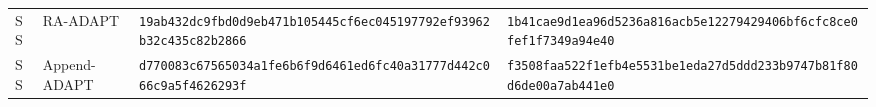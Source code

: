 \documentclass[10pt,letterpaper]{article}
\begin{document}
\begin{longtable}{@{}llp{2.55in}p{2.55in}@{}}
SS & RA-ADAPT & \texttt{19ab432d}\allowbreak{}\texttt{c9fbd0d9}\allowbreak{}\texttt{eb471b10}\allowbreak{}\texttt{5445cf6e}\allowbreak{}\texttt{c0451977}\allowbreak{}\texttt{92ef9396}\allowbreak{}\texttt{2b32c435}\allowbreak{}\texttt{c82b2866}\allowbreak{} & \texttt{1b41cae9}\allowbreak{}\texttt{d1ea96d5}\allowbreak{}\texttt{236a816a}\allowbreak{}\texttt{cb5e1227}\allowbreak{}\texttt{9429406b}\allowbreak{}\texttt{f6cfc8ce}\allowbreak{}\texttt{0fef1f73}\allowbreak{}\texttt{49a94e40}\allowbreak{} \\
SS & Append-ADAPT & \texttt{d770083c}\allowbreak{}\texttt{67565034}\allowbreak{}\texttt{a1fe6b6f}\allowbreak{}\texttt{9d6461ed}\allowbreak{}\texttt{6fc40a31}\allowbreak{}\texttt{777d442c}\allowbreak{}\texttt{066c9a5f}\allowbreak{}\texttt{4626293f}\allowbreak{} & \texttt{f3508faa}\allowbreak{}\texttt{522f1efb}\allowbreak{}\texttt{4e5531be}\allowbreak{}\texttt{1eda27d5}\allowbreak{}\texttt{ddd233b9}\allowbreak{}\texttt{747b81f8}\allowbreak{}\texttt{0d6de00a}\allowbreak{}\texttt{7ab441e0}\allowbreak{} \\
\bottomrule
\end{longtable}
\end{document}
